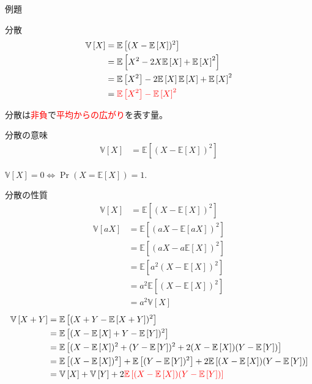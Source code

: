 \documentclass[lualatex,handout]{beamer}
\newcommand{\emm}[1]{\textcolor{red}{#1}}
\newcommand{\expt}[1]{\mathbb{E}\left[#1\right]}
\newcommand{\var}[1]{\mathbb{V}\left[#1\right]}
\theoremstyle{definition}
\begin{document}
\begin{frame}{例題}
\end{frame}

\begin{frame}{分散}
\begin{align*}
\var{X} &= \expt{(X-\expt{X})^2}\\
&=\expt{X^2-2X\expt{X}+\expt{X}^2}\\
&=\expt{X^2}-2\expt{X}\expt{X}+\expt{X}^2\\
&=\emm{\expt{X^2}-\expt{X}^2}\\
\end{align*}
\begin{center}
分散は\emm{非負}で\emm{平均からの広がり}を表す量。
\end{center}
\end{frame}

\begin{frame}{分散の意味}
\begin{align*}
\var{X} &= \expt{(X-\expt{X})^2}
\end{align*}

$\var{X} = 0 \iff \Pr(X = \expt{X})=1$.
\end{frame}

\begin{frame}{分散の性質}
\begin{align*}
\var{X} &= \expt{(X-\expt{X})^2}
\end{align*}
\begin{align*}
\var{aX} &= \expt{(aX-\expt{aX})^2}\\
&= \expt{(aX-a\expt{X})^2}\\
&= \expt{a^2(X-\expt{X})^2}\\
&= a^2\expt{(X-\expt{X})^2}\\
&= a^2\var{X}
\end{align*}
%
\begin{align*}
\var{X+Y} &= \expt{(X+Y-\expt{X+Y})^2}\\
 &= \expt{(X-\expt{X}+Y-\expt{Y})^2}\\
 &= \expt{(X-\expt{X})^2+(Y-\expt{Y})^2 + 2(X-\expt{X})(Y-\expt{Y})}\\
 &= \expt{(X-\expt{X})^2}+\expt{(Y-\expt{Y})^2} + 2\expt{(X-\expt{X})(Y-\expt{Y})}\\
 &= \var{X}+\var{Y}+ 2\emm{\expt{(X-\expt{X})(Y-\expt{Y})}}\\
\end{align*}
\end{frame}
\end{document}
